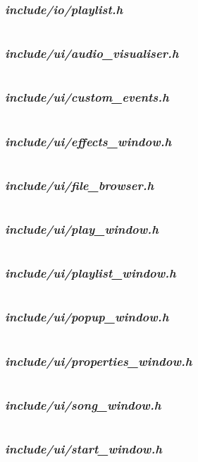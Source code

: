 \subsubsection {\textit{include/io/playlist.h}}
\inputminted[linenos]{c++}{../include/io/playlist.h}
\pagebreak
\subsubsection {\textit{include/ui/audio\_visualiser.h}}
\inputminted[linenos]{c++}{../include/ui/audio_visualiser.h}
\pagebreak
\subsubsection {\textit{include/ui/custom\_events.h}}
\inputminted[linenos]{c++}{../include/ui/custom_events.h}
\pagebreak
\subsubsection {\textit{include/ui/effects\_window.h}}
\inputminted[linenos]{c++}{../include/ui/effects_window.h}
\pagebreak
\subsubsection {\textit{include/ui/file\_browser.h}}
\inputminted[linenos]{c++}{../include/ui/file_browser.h}
\pagebreak
\subsubsection {\textit{include/ui/play\_window.h}}
\inputminted[linenos]{c++}{../include/ui/play_window.h}
\pagebreak
\subsubsection {\textit{include/ui/playlist\_window.h}}
\inputminted[linenos]{c++}{../include/ui/playlist_window.h}
\pagebreak
\subsubsection {\textit{include/ui/popup\_window.h}}
\inputminted[linenos]{c++}{../include/ui/popup_window.h}
\pagebreak
\subsubsection {\textit{include/ui/properties\_window.h}}
\inputminted[linenos]{c++}{../include/ui/properties_window.h}
\pagebreak
\subsubsection {\textit{include/ui/song\_window.h}}
\inputminted[linenos]{c++}{../include/ui/song_window.h}
\pagebreak
\subsubsection {\textit{include/ui/start\_window.h}}
\inputminted[linenos]{c++}{../include/ui/start_window.h}
\pagebreak
